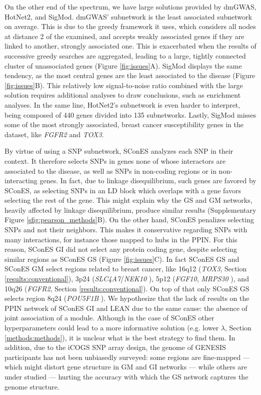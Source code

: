 \documentclass[twocolumn, 10pt]{article}
\begin{document}
On the other end of the spectrum, we have large solutions provided by dmGWAS, HotNet2, and SigMod. dmGWAS' subnetwork is the least associated subnetwork on average. This is due to the greedy framework it uses, which considers all nodes at distance 2 of the examined, and accepts weakly associated genes if they are linked to another, strongly associated one. This is exacerbated when the results of successive greedy searches are aggregated, leading to a large, tightly connected cluster of unassociated genes (Figure \ref{fig:issues}A). SigMod displays the same tendency, as the most central genes are the least associated to the disease (Figure \ref{fig:issues}B). This relatively low signal-to-noise ratio combined with the large solution requires additional analyses to draw conclusions, such as enrichment analyses. In the same line, HotNet2's subnetwork is even harder to interpret, being composed of 440 genes divided into 135 subnetworks. Lastly, SigMod misses some of the most strongly associated, breast cancer susceptibility genes in the dataset, like \emph{FGFR2} and \emph{TOX3}.

By virtue of using a SNP subnetwork, SConES analyzes each SNP in their context. It therefore selects SNPs in genes none of whose interactors are associated to the disease, as well as SNPs in non-coding regions or in non-interacting genes. In fact, due to linkage disequilibrium, such genes are favored by SConES, as selecting SNPs in an LD block which overlaps with a gene favors selecting the rest of the gene. This might explain why the GS and GM networks, heavily affected by linkage disequilibrium, produce similar results (Supplementary Figure \ref{sfig:pearson_methods}B). On the other hand, SConES penalizes selecting SNPs and not their neighbors. This makes it conservative regarding SNPs with many interactions, for instance those mapped to hubs in the PPIN. For this reason, SConES GI did not select any protein coding gene, despite selecting similar regions as SConES GS (Figure \ref{fig:issues}C). In fact SConES GS and SConES GM select regions related to breast cancer, like 16q12 (\emph{TOX3}, Section \ref{results:conventional}), 3p24 (\emph{SLC4A7}/\emph{NEK10} \cite{ahmed_newly_2009}), 5p12 (\emph{FGF10}, \emph{MRPS30} \cite{quigley_5p12_2014}), and 10q26 (\emph{FGFR2}, Section \ref{results:conventional}). On top of that only SConES GS selects region 8q24 (\emph{POU5F1B} \cite{breyer_expressed_2014}). We hypothesize that the lack of results on the PPIN network of SConES GI and LEAN due to the same cause: the absence of joint association of a module. Although in the case of SConES other hyperparameters could lead to a more informative solution (e.g. lower \(\lambda\), Section \ref{methods:methods}), it is unclear what is the best strategy to find them. In addition, due to the iCOGS SNP array design, the genome of GENESIS participants has not been unbiasedly surveyed: some regions are fine-mapped --- which might distort gene structure in GM and GI networks --- while others are under studied --- hurting the accuracy with which the GS network captures the genome structure. 
\end{document}
